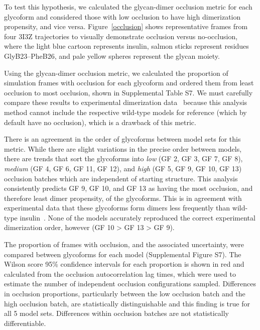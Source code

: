 \documentclass[sn-vancouver]{sn-jnl}
\begin{document}
To test this hypothesis, we calculated the glycan-dimer occlusion metric for each glycoform and considered those with low occlusion to have high dimerization propensity, and vice versa. Figure~\ref{occlusion} shows representative frames from four 3I3Z trajectories to visually demonstrate occlusion versus no-occlusion, where the light blue cartoon represents insulin, salmon sticks represent residues GlyB23--PheB26, and pale yellow spheres represent the glycan moiety. 

Using the glycan-dimer occlusion metric, we calculated the proportion of simulation frames with occlusion for each glycoform and ordered them from least occlusion to most occlusion, shown in Supplemental Table S7. We must carefully compare these results to experimental dimerization data~\cite{guan2018chemically} because this analysis method cannot include the respective wild-type models for reference (which by default have no occlusion), which is a drawback of this metric.

There is an agreement in the order of glycoforms between model sets for this metric. While there are slight variations in the precise order between models, there are trends that sort the glycoforms into \emph{low} (GF 2, GF 3, GF 7, GF 8), \emph{medium} (GF 4, GF 6, GF 11, GF 12), and \emph{high} (GF 5, GF 9, GF 10, GF 13) occlusion batches which are independent of starting structure. This analysis consistently predicts GF 9, GF 10, and GF 13 as having the most occlusion, and therefore least dimer propensity, of the glycoforms. This is in agreement with experimental data that these glycoforms form dimers less frequently than wild-type insulin~\cite{guan2018chemically}. None of the models accurately reproduced the correct experimental dimerization order, however (GF 10 > GF 13 > GF 9).

The proportion of frames with occlusion, and the associated uncertainty, were compared between glycoforms for each model (Supplemental Figure S7). The Wilson score 95\% confidence intervals for each proportion is shown in red and calculated from the occlusion autocorrelation lag times, which were used to estimate the number of independent occlusion configurations sampled. Differences in occlusion proportions, particularly between the low occlusion batch and the high occlusion batch, are statistically distinguishable and this finding is true for all 5 model sets. Differences within occlusion batches are not statistically differentiable.
\end{document}

